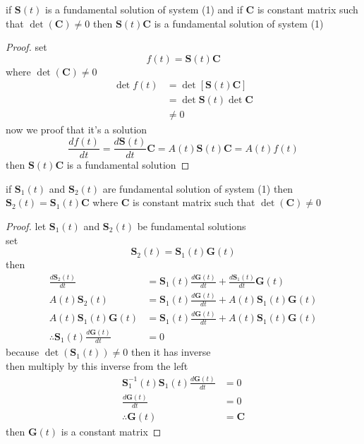 \documentclass[]{article}
\begin{document}
\begin{theorem}[]
    if $\mathbf{S}(t)$ is a fundamental solution of system (1) and if $\mathbf{C}$ is constant matrix such that $\det(\mathbf{C})\neq 0$ then $\mathbf{S}(t)\mathbf{C}$ is a fundamental
    solution of system (1)
\end{theorem}
\begin{proof}[Proof]
    set
    \[
        f(t) = \mathbf{S}(t)\mathbf{C}
    \]
    where $\det(\mathbf{C})\neq 0$
    \begin{align*}
        \det f(t) & = \det[\mathbf{S}(t)\mathbf{C}]
        \\
                  & = \det\mathbf{S}(t)\det\mathbf{C}
        \\
                  & \neq 0
    \end{align*}
    now we proof that it's a solution
    \[
        \frac{df(t)}{dt} = \frac{d\mathbf{S}(t)}{dt}\mathbf{C} =A(t)\mathbf{S}(t)\mathbf{C} = A(t)f(t)
    \]
    then $\mathbf{S}(t)\mathbf{C}$ is a fundamental solution
\end{proof}
\newpage
\begin{theorem}[]
    if $\mathbf{S}_1(t)$ and $\mathbf{S}_2(t)$ are fundamental solution of system (1) then $\mathbf{S}_2(t) = \mathbf{S}_1(t)\mathbf{C}$ where $\mathbf{C}$ is constant matrix such that $\det(\mathbf{C})\neq 0$
\end{theorem}

\begin{proof}[Proof]
    let $\mathbf{S}_1(t)$ and $\mathbf{S}_2(t)$ be fundamental solutions
    \\
    set
    \[
        \mathbf{S}_2(t) = \mathbf{S}_1(t)\mathbf{G}(t)
    \]
    then
    \begin{align*}
        \frac{d\mathbf{S}_2(t)}{dt}                         & = \mathbf{S}_1(t)\frac{d\mathbf{G}(t)}{dt} + \frac{d\mathbf{S}_1(t)}{dt}\mathbf{G}(t)
        \\
        A(t)\mathbf{S}_2(t)                                 & = \mathbf{S}_1(t)\frac{d\mathbf{G}(t)}{dt} + A(t)\mathbf{S}_1(t)\mathbf{G}(t)
        \\
        A(t)\mathbf{S}_1(t)\mathbf{G}(t)                    & = \mathbf{S}_1(t)\frac{d\mathbf{G}(t)}{dt} + A(t)\mathbf{S}_1(t)\mathbf{G}(t)
        \\
        \therefore \mathbf{S}_1(t)\frac{d\mathbf{G}(t)}{dt} & = 0
    \end{align*}
    because $\det(\mathbf{S}_1(t))\neq 0$ then it has inverse
    \\
    then multiply by this inverse from the left
    \begin{align*}
        \mathbf{S}_1^{-1}(t)\mathbf{S}_1(t)\frac{d\mathbf{G}(t)}{dt} & = 0
        \\
        \frac{d\mathbf{G}(t)}{dt}                                    & = 0
        \\
        \therefore \mathbf{G}(t)                                     & = \mathbf{C}
    \end{align*}
    then $\mathbf{G}(t)$ is a constant matrix
\end{proof}
\end{document}
